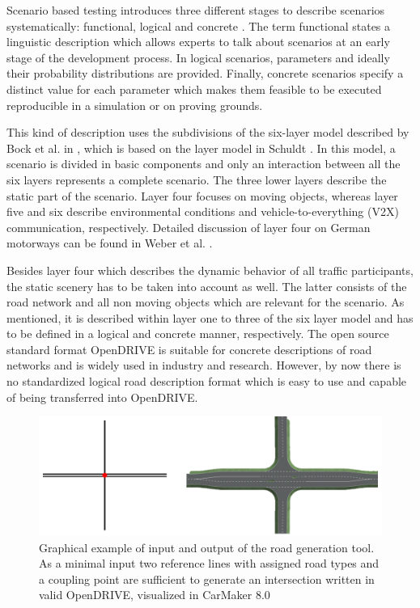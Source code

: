 \documentclass[a4paper, 10pt, conference]{ieeeconf}      %
\begin{document}
Scenario based testing introduces three different stages to describe scenarios systematically: functional, logical and concrete \cite{menzel2018scenarios}. The term functional states a linguistic description which allows experts to talk about scenarios at an early stage of the development process. In logical scenarios, parameters and ideally their probability distributions are provided. Finally, concrete scenarios specify a distinct value for each parameter which makes them feasible to be executed reproducible in a simulation or on proving grounds. 

This kind of description uses the subdivisions of the six-layer model described by Bock et al. in \cite{bock2018data}, which is based on the layer model in Schuldt \cite{schuldt2017beitrag}. In this model, a scenario is divided in basic components and only an interaction between all the six layers represents a complete scenario. The three lower layers describe the static part of the scenario. Layer four focuses on moving objects, whereas layer five and six describe environmental conditions and vehicle-to-everything (V2X) communication, respectively. Detailed discussion of layer four on German motorways can be found in Weber et al. \cite{weber2019framework}.

Besides layer four which describes the dynamic behavior of all traffic participants, the static scenery has to be taken into account as well. The latter consists of the road network and all non moving objects which are relevant for the scenario. As mentioned, it is described within layer one to three of the six layer model and has to be defined in a logical and concrete manner, respectively. The open source standard format OpenDRIVE \cite{odr1.5} is suitable for concrete descriptions of road networks and is widely used in industry and research. However, by now there is no standardized logical road description format which is easy to use and capable of being transferred into OpenDRIVE.
\begin{figure}[t] 		
	\centering
	\includegraphics{fig/motivation.png}
	\caption[dummy]{Graphical example of input and output of the road generation tool. As a minimal input two reference lines with assigned road types and a coupling point are sufficient to generate an intersection written in valid OpenDRIVE, visualized in CarMaker 8.0\footnotemark}
	\label{fig_motivation}
\end{figure}
\end{document}
